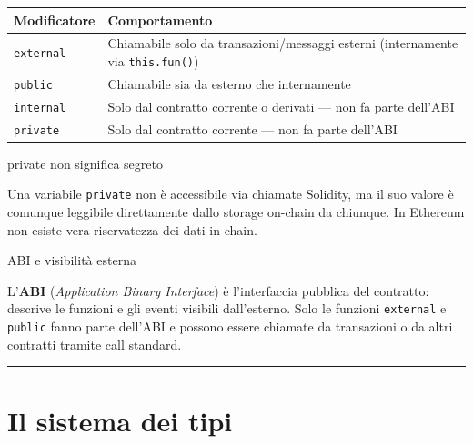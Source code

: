 \documentclass[
  italian,
  openany]{book}
\newcounter{none} %
\begin{document}
{\def\LTcaptype{none} %
\begin{longtable}[]{@{}
  >{\raggedright\arraybackslash}p{}
  >{\raggedright\arraybackslash}p{}@{}}
\toprule\noalign{}
\begin{minipage}[b]{\linewidth}\raggedright
Modificatore
\end{minipage} & \begin{minipage}[b]{\linewidth}\raggedright
Comportamento
\end{minipage} \\
\midrule\noalign{}
\endhead
\bottomrule\noalign{}
\endlastfoot
\texttt{external} & Chiamabile solo da transazioni/messaggi esterni
(internamente via \texttt{this.fun()}) \\
\texttt{public} & Chiamabile sia da esterno che internamente \\
\texttt{internal} & Solo dal contratto corrente o derivati --- non fa
parte dell'ABI \\
\texttt{private} & Solo dal contratto corrente --- non fa parte
dell'ABI \\
\end{longtable}
}

\begin{calloutwarning}{private non significa segreto}

Una variabile \texttt{private} non è accessibile via chiamate Solidity,
ma il suo valore è comunque leggibile direttamente dallo storage
on-chain da chiunque. In Ethereum non esiste vera riservatezza dei dati
in-chain.

\end{calloutwarning}

\begin{callouttip}{ABI e visibilità esterna}

L'\textbf{ABI} (\emph{Application Binary Interface}) è l'interfaccia
pubblica del contratto: descrive le funzioni e gli eventi visibili
dall'esterno. Solo le funzioni \texttt{external} e \texttt{public} fanno
parte dell'ABI e possono essere chiamate da transazioni o da altri
contratti tramite call standard.

\end{callouttip}

\begin{center}\rule{0.5\linewidth}{0.5pt}\end{center}

\section{Il sistema dei tipi}\label{il-sistema-dei-tipi}
\end{document}
